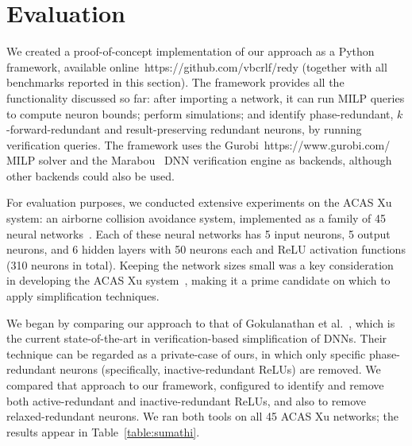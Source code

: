 \documentclass[10pt, conference, twocolumn, compsocconf]{IEEEtran}
\theoremstyle{remark}
\newcommand{\kfr}{$k$-forward-redundant}
\newcommand{\todo}[1]{{\color{red}{\textbf{[TODO]} #1}}}
\newcommand{\guy}[1]{\marginpar{\textcolor{orange}{Guy: #1}}}
\begin{document}







\section{Evaluation}
\label{sec:evaluation}
We created a proof-of-concept implementation of our approach as a
Python framework, available online~https://github.com/vbcrlf/redy (together with all
benchmarks reported in this section). The framework provides all the
functionality discussed so far: after importing a network, it can run
MILP queries to compute neuron bounds; perform simulations; and
identify phase-redundant, \kfr{} and result-preserving redundant
neurons, by running verification queries. The framework uses
the Gurobi~https://www.gurobi.com/ MILP solver and the Marabou~\cite{Marabou2019} DNN
verification engine as backends, although other backends could also be
used.

For evaluation purposes, we conducted extensive experiments on the
ACAS Xu system: an airborne collision avoidance system, implemented as
a family of 45 neural networks~\cite{JuLoBrOwKo16}. Each of these
neural networks has 5 input neurons, 5 output neurons, and 6 hidden
layers with 50 neurons each and ReLU activation functions (310 neurons
in total). Keeping the network sizes small was a key consideration in
developing the ACAS Xu system~\cite{JuLoBrOwKo16}, making it a prime
candidate on which to apply simplification techniques.

We began by comparing our approach to that of
Gokulanathan et al.~\cite{GoFeMaBaKa20}, which is the current
state-of-the-art in verification-based simplification of DNNs. Their
technique can be regarded as a private-case of ours, in which only
specific phase-redundant neurons (specifically, inactive-redundant
ReLUs) are removed. We compared that approach to our framework,
configured to identify and remove both active-redundant and
inactive-redundant ReLUs, and also to remove relaxed-redundant neurons.
We ran both tools on all 45 ACAS Xu networks; the
results appear in Table~\ref{table:sumathi}.
\end{document}
